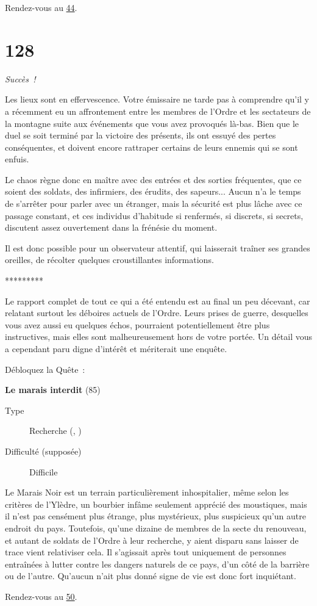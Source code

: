 \documentclass{report}
\newcommand{\gsection}[1]{
    \section{#1}
    \label{section-#1}
}
\newcommand{\glink}[1]{\hyperref[section-#1]{#1}}
\newcommand{\quest}[5]{
    \begin{mdframed}[innertopmargin=0.5cm,innerbottommargin=0.5cm,leftmargin=0.5cm,rightmargin=0.5cm]
        \begin{center}
            \textbf{#1} (#2)
        \end{center}
        \begin{description}
            \item[Type] #3
            \item[Difficulté (supposée)] #4
        \end{description}
        #5
    \end{mdframed}
}
\newcommand{\ellipse}{
    \begin{center}
        *********
    \end{center}
}
\newcommand{\success}{\emph{Succès !}}
\begin{document}
Rendez-vous au \glink{44}.

\gsection{128}

\success

Les lieux sont en effervescence. Votre émissaire ne tarde pas à comprendre qu'il y a récemment eu un affrontement entre les membres de l'Ordre et les sectateurs de la montagne suite aux événements que vous avez provoqués là-bas. Bien que le duel se soit terminé par la victoire des présents, ils ont essuyé des pertes conséquentes, et doivent encore rattraper certains de leurs ennemis qui se sont enfuis.

Le chaos règne donc en maître avec des entrées et des sorties fréquentes, que ce soient des soldats, des infirmiers, des érudits, des sapeurs... Aucun n'a le temps de s'arrêter pour parler avec un étranger, mais la sécurité est plus lâche avec ce passage constant, et ces individus d'habitude si renfermés, si discrets, si secrets, discutent assez ouvertement dans la frénésie du moment.

Il est donc possible pour un observateur attentif, qui laisserait traîner ses grandes oreilles, de récolter quelques croustillantes informations.

\ellipse

Le rapport complet de tout ce qui a été entendu est au final un peu décevant, car relatant surtout les déboires actuels de l'Ordre. Leurs prises de guerre, desquelles vous avez aussi eu quelques échos, pourraient potentiellement être plus instructives, mais elles sont malheureusement hors de votre portée.
Un détail vous a cependant paru digne d'intérêt et mériterait une enquête.

Débloquez la Quête :

\clearpage

\quest{Le marais interdit}{85}{Recherche (\ankh, \caduceus)}{Difficile}{
Le Marais Noir est un terrain particulièrement inhospitalier, même selon les critères de l'Ylèdre, un bourbier infâme seulement apprécié des moustiques, mais il n'est pas censément plus étrange, plus mystérieux, plus suspicieux qu'un autre endroit du pays. Toutefois, qu'une dizaine de membres de la secte du renouveau, et autant de soldats de l'Ordre à leur recherche, y aient disparu sans laisser de trace vient relativiser cela. Il s'agissait après tout uniquement de personnes entraînées à lutter contre les dangers naturels de ce pays, d'un côté de la barrière ou de l'autre. Qu'aucun n'ait plus donné signe de vie est donc fort inquiétant.
}

Rendez-vous au \glink{50}.
\end{document}
